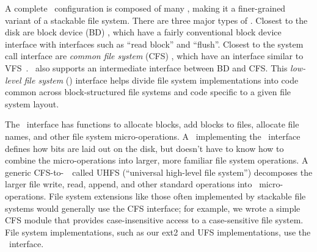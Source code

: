 
\label{sec:modules:interfaces}

\begin{comment}
New \modules\ are
simple to write, and by changing the \module\ arrangement, a broad range of
behaviors can be implemented. It's also easy to tell what behavior a given
arrangement will give just by looking at the connections between the \modules.
\end{comment}

A complete \Kudos\ configuration is composed of many \modules, making it
a finer-grained variant of a stackable file system.
%
There are three major types of \modules.
%
Closest to the disk are block device (BD) \modules, which have a fairly
conventional block device interface with interfaces such as ``read block'' and
``flush''. 
%
Closest to the system call interface are \emph{common file system} (CFS)
\modules, which have an interface similar to VFS~\cite{kleiman86vnodes}. 
%
\Kudos\ also supports an intermediate interface between BD and CFS.
%
This \emph{low-level file system} (\LFS) interface helps divide file system
implementations into code common across block-structured file systems and
code specific to a given file system layout.
%
\begin{comment}
A
\Kudos\ file system designer combines modules with all three interfaces in many
ways -- a departure from stackable file systems, which act only at the VFS/CFS
layer. \Kudos\ \modules\ are implemented in C using structures of function
pointers to achieve object oriented behavior, very much like the rest of the
Linux kernel.
\end{comment}
%
The \LFS\ interface has functions to allocate blocks, add blocks to files,
allocate file names, and other file system micro-operations. A \module\
implementing the \LFS\ interface defines how bits are laid out on the disk, but
doesn't have to know how to combine the micro-operations into larger, more
familiar file system operations. A generic CFS-to-\LFS\ \module\ called UHFS
(``universal high-level file system'') decomposes the larger file write, read,
append, and other standard operations into \LFS\ micro-operations. 
%
File system extensions like those often implemented by stackable file
systems would generally use the CFS interface; for example, we wrote a
simple CFS module that provides case-insensitive access to a case-sensitive
file system.
%
File system implementations, such as our ext2 and UFS implementations, use
the \LFS\ interface.


